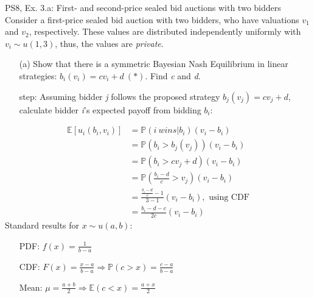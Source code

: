 \begin{frame}{PS8, Ex. 3.a: First- and second-price sealed bid auctions with two bidders}
    Consider a first-price sealed bid auction with two bidders, who have valuations $v_1$ and $v_2$, respectively. These values are distributed independently uniformly with $v_i\sim u(1,3)$, thus, the values are \textit{private}.
    \vspace{-4pt}
    \begin{itemize}
      \item[(a)] Show that there is a symmetric Bayesian Nash Equilibrium in linear strategies: $b_i(v_i) = cv_i + d\ (*)$. Find \textit{c} and \textit{d}.
    \end{itemize}
    \vspace{-8pt}
    \begin{multicols}{2}
      \begin{itemize}
        \item[\nth{1} step:] Assuming bidder \textit{j} follows the proposed strategy $b_j(v_j) = cv_j + d$, calculate bidder \textit{i}'s expected payoff from bidding $b_i$:
      \end{itemize}
      \vspace{-4pt}
      \begin{align*}
        \mathbb{E}[u_i(b_i,v_i)]&=\mathbb{P}(i\ wins|b_i)(v_i-b_i)\\
                                &=\mathbb{P}(b_i>b_j(v_j))(v_i-b_i)\\
                                &=\mathbb{P}(b_i>cv_j+d)(v_i-b_i)\\
                                &=\mathbb{P}\left(\frac{b_i-d}{c}>v_j\right)(v_i-b_i)\\
                                &=\frac{\frac{b_i-d}{c}-1}{3-1}(v_i-b_i),\text{ using CDF}\\
                                &=\frac{b_i-d-c}{2c}(v_i-b_i)
      \end{align*}
      \vfill\null\columnbreak
      Standard results for $x\sim u(a, b):$
      \vspace{-6pt}
      \begin{enumerate}
        \item[PDF:] $f(x)=\frac{1}{b-a}$
        \item[CDF:] $F(x)=\frac{x-a}{b-a}\Rightarrow\mathbb{P}(c>x)=\frac{c-a}{b-a}$
        \item[Mean:] $\mu=\frac{a+b}{2}\Rightarrow\mathbb{E}(c<x)=\frac{a+x}{2}$
      \end{enumerate}
      \vfill\null
    \end{multicols}
\end{frame}
